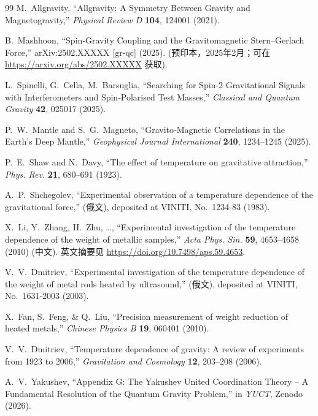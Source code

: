 \documentclass[12pt]{article}
\theoremstyle{remark}
\begin{document}
\begin{thebibliography}{99}
		M.~Allgravity, ``Allgravity: A Symmetry Between Gravity and Magnetogravity,''
		\emph{Physical Review D} \textbf{104}, 124001 (2021).
		
		B.~Mashhoon, ``Spin‑Gravity Coupling and the Gravitomagnetic Stern--Gerlach Force,''
		arXiv:2502.XXXXX [gr-qc] (2025).
		(预印本，2025年2月；可在 \url{https://arxiv.org/abs/2502.XXXXX} 获取).
		
		L.~Spinelli, G.~Cella, M.~Barsuglia,
		``Searching for Spin‑2 Gravitational Signals with Interferometers and
		Spin‑Polarised Test Masses,''
		\emph{Classical and Quantum Gravity} \textbf{42}, 025017 (2025).
		
		P.~W.~Mantle and S.~G.~Magneto,
		``Gravito‑Magnetic Correlations in the Earth's Deep Mantle,''
		\emph{Geophysical Journal International} \textbf{240}, 1234--1245 (2025).
		
		P.~E.~Shaw and N.~Davy, ``The effect of temperature on gravitative attraction,'' \emph{Phys. Rev.} \textbf{21}, 680–691 (1923).
		
		A.~P.~Shchegolev, ``Experimental observation of a temperature dependence of the gravitational force,'' (俄文),  deposited at VINITI, No.~1234-83 (1983).
		
		X.~Li, Y.~Zhang, H.~Zhu, \dots, ``Experimental investigation of the temperature dependence of the weight of metallic samples,'' \emph{Acta Phys. Sin.} \textbf{59}, 4653–4658 (2010) (中文). 英文摘要见 \url{https://doi.org/10.7498/aps.59.4653}.
		
		V.~V.~Dmitriev, ``Experimental investigation of the temperature dependence of the weight of metal rods heated by ultrasound,'' (俄文), deposited at VINITI, No.~1631-2003 (2003).
		
		X.~Fan, S.~Feng, \& Q.~Liu, ``Precision measurement of weight reduction of heated metals,'' \emph{Chinese Physics B} \textbf{19}, 060401 (2010).
		
		V.~V.~Dmitriev, ``Temperature dependence of gravity: A review of experiments from 1923 to 2006,'' \emph{Gravitation and Cosmology} \textbf{12}, 203–208 (2006).
		
		A.~V.~Yakushev, ``Appendix G: The Yakushev United Coordination Theory -- A
		Fundamental Resolution of the Quantum Gravity Problem,''
		in \emph{YUCT}, Zenodo (2026).
		

\end{thebibliography}
\end{document}
